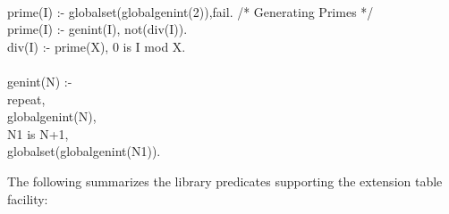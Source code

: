 {\tt
\begin{tabbing}
prime(I) :- globalset(globalgenint(2)),fail.	/* Generating Primes */ \\
prime(I) :- genint(I), not(div(I)). \\
div(I) :- prime(X), 0 is I mod X. \\
 \\
genint(N) :- \\
    repeat, \\
	globalgenint(N), \\
	N1 is N+1, \\
	globalset(globalgenint(N1)). \\
\end{tabbing}
}

The following summarizes the library predicates supporting the extension
table facility:

